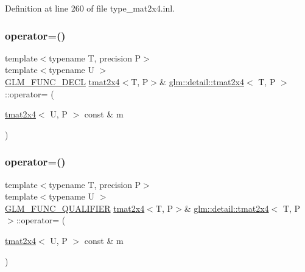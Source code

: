 Definition at line 260 of file type\+\_\+mat2x4.\+inl.

\mbox{\label{structglm_1_1detail_1_1tmat2x4_a422287398bdb26f5d22bd9e91656889d}} 
\subsubsection{\texorpdfstring{operator=()}{operator=()}\hspace{0.1cm}{\footnotesize\ttfamily [2/3]}}
{\footnotesize\ttfamily template$<$typename T, precision P$>$ \\
template$<$typename U $>$ \\
\hyperlink{setup_8hpp_ab2d052de21a70539923e9bcbf6e83a51}{G\+L\+M\+\_\+\+F\+U\+N\+C\+\_\+\+D\+E\+CL} \hyperlink{structglm_1_1detail_1_1tmat2x4}{tmat2x4}$<$T, P$>$\& \hyperlink{structglm_1_1detail_1_1tmat2x4}{glm\+::detail\+::tmat2x4}$<$ T, P $>$\+::operator= (\begin{DoxyParamCaption}\item[{\hyperlink{structglm_1_1detail_1_1tmat2x4}{tmat2x4}$<$ U, P $>$ const \&}]{m }\end{DoxyParamCaption})}

\mbox{\label{structglm_1_1detail_1_1tmat2x4_a05368bd4ad581b0e7d000b051f71bae5}} 
\subsubsection{\texorpdfstring{operator=()}{operator=()}\hspace{0.1cm}{\footnotesize\ttfamily [3/3]}}
{\footnotesize\ttfamily template$<$typename T, precision P$>$ \\
template$<$typename U $>$ \\
\hyperlink{setup_8hpp_a33fdea6f91c5f834105f7415e2a64407}{G\+L\+M\+\_\+\+F\+U\+N\+C\+\_\+\+Q\+U\+A\+L\+I\+F\+I\+ER} \hyperlink{structglm_1_1detail_1_1tmat2x4}{tmat2x4}$<$T, P$>$\& \hyperlink{structglm_1_1detail_1_1tmat2x4}{glm\+::detail\+::tmat2x4}$<$ T, P $>$\+::operator= (\begin{DoxyParamCaption}\item[{\hyperlink{structglm_1_1detail_1_1tmat2x4}{tmat2x4}$<$ U, P $>$ const \&}]{m }\end{DoxyParamCaption})}



